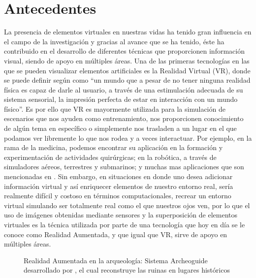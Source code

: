 \documentclass[a4paper,openright,12pt]{report}
\begin{document}
\section{Antecedentes}
La presencia de elementos virtuales en nuestras vidas ha tenido gran influencia en el campo de la investigación y gracias al avance que se ha tenido, éste ha contribuido en el desarrollo de diferentes técnicas que proporcionen información visual, siendo de apoyo en múltiples áreas. Una de las primeras tecnologías en las que se pueden visualizar elementos artificiales es la Realidad Virtual (VR), donde se puede definir según \cite{coiffet1995} como ``un mundo que a pesar de no tener ninguna realidad física es capaz de darle al usuario, a través de una estimulación adecuada de su sistema sensorial, la impresión perfecta de estar en interacción con un mundo físico''. Es por ello que VR es mayormente utilizada para la simulación de escenarios que nos ayuden como entrenamiento, nos proporcionen conocimiento de algún tema en específico o simplemente nos trasladen a un lugar en el que podamos ver libremente lo que nos rodea y a veces interactuar. Por ejemplo, en la rama de la medicina, podemos encontrar su aplicación en la formación y experimentación de actividades quirúrgicas; en la robótica, a través de simuladores aéreos, terrestres y submarinos; y muchas mas aplicaciones que son mencionadas en \cite{levis1997}. Sin embargo, en situaciones en donde uno desea adicionar información virtual y así enriquecer elementos de nuestro entorno real, sería realmente difícil y costoso en términos computacionales, recrear un entorno virtual simulando ser totalmente real como el que nuestros ojos ven, por lo que el uso de imágenes obtenidas mediante sensores y la superposición de elementos virtuales es la técnica utilizada por parte de una tecnología que hoy en día se le conoce como Realidad Aumentada, y que igual que VR, sirve de apoyo en múltiples áreas.
\begin{figure}[th]
	\centering
	\caption[Realidad Aumentada en la arqueología]{Realidad Aumentada en la arqueología: Sistema Archeoguide desarrollado por \cite{vlahakis2002}, el cual reconstruye las ruinas en lugares históricos} \label{fig:arqueologia}
\end{figure}
\end{document}
